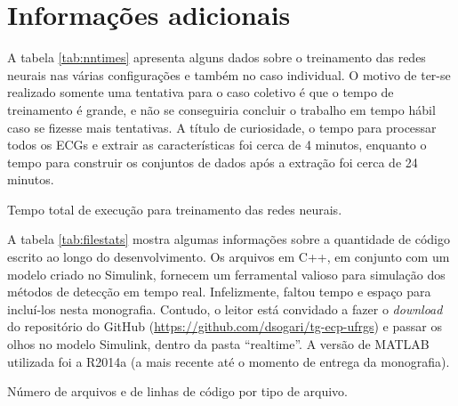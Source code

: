 
\section{Informações adicionais}

A tabela \ref{tab:nntimes} apresenta alguns dados sobre o treinamento das redes neurais nas várias configurações e também no caso individual. O motivo de ter-se realizado somente uma tentativa para o caso coletivo é que o tempo de treinamento é grande, e não se conseguiria concluir o trabalho em tempo hábil caso se fizesse mais tentativas. A título de curiosidade, o tempo para processar todos os ECGs e extrair as características foi cerca de 4 minutos, enquanto o tempo para construir os conjuntos de dados após a extração foi cerca de 24 minutos.

\begin{table}[ht!]
    \centering
    
    \caption[Tempo total de execução para treinamento das redes neurais]{Tempo total de execução para treinamento das redes neurais.}
    \label{tab:nntimes}
\end{table}

A tabela \ref{tab:filestats} mostra algumas informações sobre a quantidade de código escrito ao longo do desenvolvimento. Os arquivos em C++, em conjunto com um modelo criado no Simulink, fornecem um ferramental valioso para simulação dos métodos de detecção em tempo real. Infelizmente, faltou tempo e espaço para incluí-los nesta monografia. Contudo, o leitor está convidado a fazer o \emph{download} do repositório do GitHub (\url{https://github.com/dsogari/tg-ecp-ufrgs}) e passar os olhos no modelo Simulink, dentro da pasta ``realtime''. A versão de MATLAB utilizada foi a R2014a (a mais recente até o momento de entrega da monografia).

\begin{table}[ht!]
    \centering
    
    \caption[Número de arquivos e de linhas de código por tipo de arquivo]{Número de arquivos e de linhas de código por tipo de arquivo.}
    \label{tab:filestats}
\end{table}